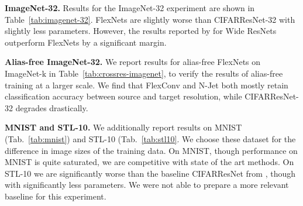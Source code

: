 \documentclass{article} \usepackage{iclr2022_conference,times}
\begin{document}
\textbf{ImageNet-32.} Results for the ImageNet-32 experiment are shown in Table~\ref{tab:imagenet-32}. FlexNets are slightly worse than CIFARResNet-32 \citep{he2016deep} with slightly less parameters. However, the results reported by \citet{ChrabaszczLH17} for Wide ResNets \citep{zagoruyko2016wide} outperform FlexNets by a significant margin.

\textbf{Alias-free ImageNet-32.} We report results for alias-free FlexNets on ImageNet-$\mathrm{k}$ \citep{ChrabaszczLH17} in Table~\ref{tab:crossres-imagenet}, to verify the results of alias-free training at a larger scale. We find that FlexConv and N-Jet both mostly retain classification accuracy between source and target resolution, while CIFARResNet-32 degrades drastically.

\textbf{MNIST and STL-10.} We additionally report results on MNIST (Tab.~\ref{tab:mnist}) and STL-10 (Tab.~\ref{tab:stl10}. We choose these dataset for the difference in image sizes of the training data. On MNIST, though performance on MNIST is quite saturated, we are competitive with state of the art methods. On STL-10 we are significantly worse than the baseline CIFARResNet from \citep{luo2020extended}, though with significantly less parameters. We were not able to prepare a more relevant baseline for this experiment.

\begin{table}
\centering
\caption{Results on MNIST. We train each model with three different seeds and report mean and standard deviation. *Results are taken from the respective original works instead of reproduced. \dagger Results are from single run.}
\label{tab:mnist}
\begin{center}
\end{center}
\end{table}
\end{document}
